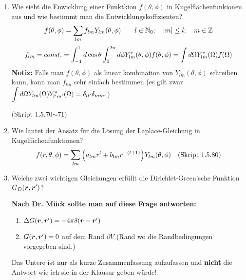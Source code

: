 \begin{enumerate}
  \item Wie sieht die Enwicklung einer Funktkion $f(\theta,\phi)$ in %
        Kugelflächenfunkionen aus und wie bestimmt man die 
        Entwicklungskoffizienten?
        $$\displaystyle f(\theta, \phi)=\sum_{lm} f_{lm}Y_{lm}(\theta,\phi)
        \qquad l\in \mathbb{N}_0;\quad \abs{m}\le l; 
        \quad m\in\mathbb{Z}$$
        $$\displaystyle f_{lm}=const.
         =\int_{-1}^{1} d\cos\theta\int_0^{2\pi}d\phi 
         Y^*_{lm}(\theta,\phi)f(\theta,\phi)
         =\int d\Omega Y^*_{lm}(\Omega)f(\Omega)$$
         \textbf{Notiz:} Falls man $f(\theta,\phi)$ als linear kombination
         von $Y_{lm}(\theta,\phi)$ schreiben kann, kann man $f_{lm}$
         sehr einfach bestimmen (es gilt zwar $\displaystyle \int d\Omega 
         Y_{lm}(\Omega)Y_{l'm'}^*(\Omega)=\delta_{ll'}\delta_{mm'}$)
        \begin{center}
          (Skript 1.5.70$\sim$71)
        \end{center}

  \item Wie lautet der Ansatz für die Lösung der Laplace-Gleichung in %
        Kugelfächenfunktionen?\\
        $$f(r,\theta,\phi)=
        \sum_{lm}\qty(a_{lm}r^l+b_{lm}r^{-(l+1)})Y_{lm}(\theta,\phi)
        \quad\text{(Skript 1.5.80)}$$
         
  \item Welche zwei wichtigen Gleichungen erfüllt die %
    Dirichlet-Green'sche
        Funktion $G_D(\vb* r, \vb* r')$?

        \textbf{Nach Dr. Mück sollte man auf diese Frage antworten:}
        \begin{enumerate}
          \item $\Delta G(\vb* r, \vb* r')=-4\pi \delta(\vb* r- \vb*r')$
          \item $G(\vb* r, \vb* r')=0$ auf dem Rand $\partial V$ (Rand 
            wo die Randbedingungen vorgegeben sind.)
        \end{enumerate}

        Das Untere ist nur als kurze Zusammenfassung aufzufassen und  
        \textbf{nicht} die Antwort wie ich sie in der Klausur geben würde!


\end{enumerate}
